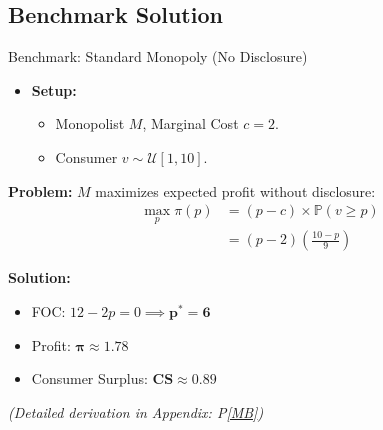 \documentclass{beamer}
\begin{document}
\subsection{Benchmark Solution}
\begin{frame}{Benchmark: Standard Monopoly (No Disclosure)}
    \begin{itemize}
        \item \textbf{Setup:}
        \begin{itemize}
            \item Monopolist $M$, Marginal Cost $c=2$.
            \item Consumer $v \sim \mathcal{U}[1,10]$.
        \end{itemize}
    \end{itemize}

    \textbf{Problem:} $M$ maximizes expected profit without disclosure:
    \begin{align*}
        \max_{p} \pi(p) &= (p - c) \times \mathbb{P}(v \ge p) \\
        &= (p - 2) \left( \frac{10 - p}{9} \right)
    \end{align*}

    \textbf{Solution:}
    \begin{itemize}
        \item FOC: $12 - 2p = 0 \implies \mathbf{p^* = 6}$
        \item Profit: $\mathbf{\pi \approx 1.78}$
        \item Consumer Surplus: $\mathbf{CS \approx 0.89}$
    \end{itemize}
    \footnotesize{\textit{(Detailed derivation in Appendix: P\ref{MB})}}
\end{frame}
\end{document}
